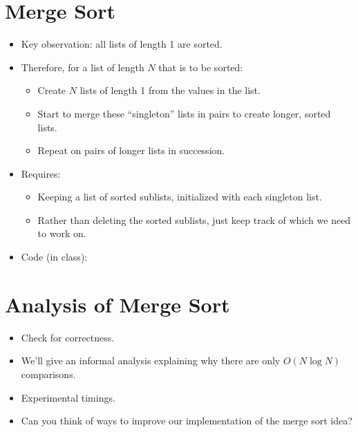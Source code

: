 \documentclass[letterpaper,10pt,english]{sphinxmanual}
\begin{document}
\section{Merge Sort}
\label{\detokenize{lecture_notes/lec21_sorting:merge-sort}}\begin{itemize}
\item {} 
Key observation: all lists of length 1 are sorted.

\item {} 
Therefore, for a list of length \(N\) that is to be sorted:
\begin{itemize}
\item {} 
Create \(N\) lists of length 1 from the values in the list.

\item {} 
Start to merge these “singleton” lists in pairs to create longer,
sorted lists.

\item {} 
Repeat on pairs of longer lists in succession.

\end{itemize}

\item {} 
Requires:
\begin{itemize}
\item {} 
Keeping a list of sorted sublists, initialized with each singleton
list.

\item {} 
Rather than deleting the sorted sublists, just keep track of which
we need to work on.

\end{itemize}

\item {} 
Code (in class):

\begin{sphinxVerbatim}[commandchars=\\\{\}]
 
       
\end{sphinxVerbatim}

\end{itemize}


\section{Analysis of Merge Sort}
\label{\detokenize{lecture_notes/lec21_sorting:analysis-of-merge-sort}}\begin{itemize}
\item {} 
Check for correctness.

\item {} 
We’ll give an informal analysis explaining why there are only
\(O(N \log N)\) comparisons.

\item {} 
Experimental timings.

\item {} 
Can you think of ways to improve our implementation of the merge sort
idea?

\end{itemize}
\end{document}
